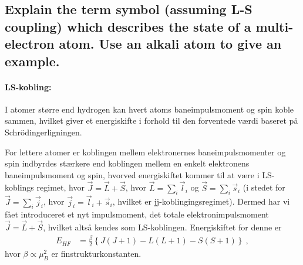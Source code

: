 \subsection{Explain the term symbol (assuming L-S coupling) which describes the state of a multi-electron atom. Use an alkali atom to give an example.}


\paragraph{LS-kobling:} I atomer større end hydrogen kan hvert atoms baneimpulsmoment og spin koble sammen, hvilket giver et energiskifte i forhold til den forventede værdi baseret på Schrödingerligningen.

For lettere atomer er koblingen mellem elektronernes baneimpulsmomenter og spin indbyrdes stærkere end koblingen mellem en enkelt elektronens baneimpulsmoment og spin, hvorved energiskiftet kommer til at være i LS-koblings regimet, hvor $\Vec{J} = \Vec{L} + \Vec{S}$, hvor $\Vec{L} = \sum_i \Vec{l}_i$ og $\Vec{S} = \sum_i \Vec{s}_i$ (i stedet for $\Vec{J} = \sum_i \Vec{j}_i$, hvor $\Vec{j}_i = \Vec{l}_i + \Vec{s}_i$, hvilket er jj-koblingingsregimet). Dermed har vi fået introduceret et nyt impulsmoment, det totale elektronimpulsmoment $\Vec{J} = \Vec{L} + \Vec{S}$, hvilket altså kendes som LS-koblingen. Energiskiftet for denne er
\begin{align}
    E_{HF} &= \frac{\beta}{2} \left\{J(J+1) - L(L+1) - S(S+1)\right\} \: ,
\end{align}
hvor $\beta \propto \mu_B^2$ er finstrukturkonstanten.


